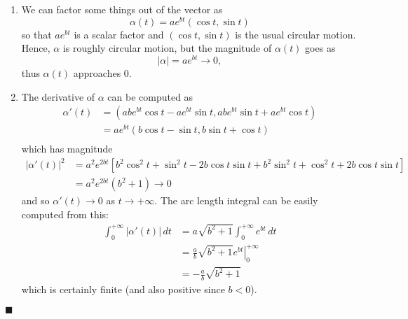 \documentclass[12pt]{article}
\renewcommand{\qed}{\hfill$\blacksquare$}
\renewenvironment{proof}{\begin{addmargin}[1em]{0em}\begin{newproof}}{\end{newproof}\end{addmargin}\qed}
\newenvironment{problem}[2][Exercise]{\begin{trivlist}
\item[\hskip \labelsep {\bfseries #1}\hskip \labelsep {\bfseries #2.}]}{\end{trivlist}}
\begin{document}
\begin{proof}
\begin{enumerate}[label=(\alph*)]
	\item We can factor some things out of the vector as \[ \alpha\left(t\right) = ae^{bt} \left(\cos t, \sin t\right) \] so that $ae^{bt}$ is a scalar factor and $\left(\cos t, \sin t\right)$ is the usual circular motion. Hence, $\alpha$ is roughly circular motion, but the magnitude of $\alpha\left(t\right)$ goes as \[ \left|\alpha\right| = ae^{bt} \rightarrow 0, \] thus $\alpha\left(t\right)$ approaches $0$.
	\item The derivative of $\alpha$ can be computed as
		\begin{align*}
			\alpha'\left(t\right) & = \left(abe^{bt}\cos t - ae^{bt}\sin t, abe^{bt}\sin t + ae^{bt}\cos t \right) \\
			& = ae^{bt}\left( b\cos t - \sin t, b\sin t + \cos t\right) \\
		\end{align*}
		which has magnitude
		\begin{align*}
			\left| \alpha'\left(t\right) \right|^2 & = a^2e^{2bt} \left[b^2\cos^2 t +\sin^2 t - 2b\cos t \sin t + b^2 \sin^2 t + \cos^2 t + 2b\cos t \sin t\right] \\
			& = a^2e^{2bt}\left(b^2 + 1\right) \rightarrow 0
		\end{align*}
		and so $\alpha'\left(t\right)\rightarrow 0$ as $t\rightarrow +\infty$. The arc length integral can be easily computed from this:
		\begin{align*}
			\int_{0}^{+\infty} \left| \alpha'\left(t\right) \right| \, dt & = a\sqrt{b^2+1}\int_{0}^{+\infty} e^{bt} \, dt \\
			& = \frac{a}{b}\sqrt{b^2+1} \left. e^{bt} \right|_0^{+\infty} \\ 
			& = - \frac{a}{b}\sqrt{b^2+1}
		\end{align*}
		which is certainly finite (and also positive since $b<0$).
\end{enumerate}
\end{proof}









\begin{problem}{1.3.7}

\end{problem}




\end{document}
